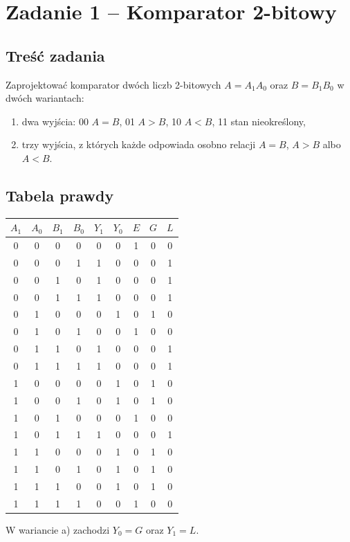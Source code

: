 \documentclass[12pt,a4paper]{article}
\begin{document}
\section{Zadanie 1 -- Komparator 2-bitowy}
\subsection{Treść zadania}
Zaprojektować komparator dwóch liczb 2-bitowych $A=A_1A_0$ oraz $B=B_1B_0$ w dwóch wariantach:
\begin{enumerate}[label=\alph*)]
\item dwa wyjścia: 00  $A=B$, 01  $A>B$, 10  $A<B$, 11 stan nieokreślony,
\item trzy wyjścia, z których każde odpowiada osobno relacji $A=B$, $A>B$ albo $A<B$.
\end{enumerate}
\subsection{Tabela prawdy}
\begin{center}
\small
\begin{tabular}{cccc|cc|ccc}
\toprule
$A_1$&$A_0$&$B_1$&$B_0$&$Y_1$&$Y_0$&$E$&$G$&$L$\\
\midrule
0&0&0&0&0&0&1&0&0\\
0&0&0&1&1&0&0&0&1\\
0&0&1&0&1&0&0&0&1\\
0&0&1&1&1&0&0&0&1\\
0&1&0&0&0&1&0&1&0\\
0&1&0&1&0&0&1&0&0\\
0&1&1&0&1&0&0&0&1\\
0&1&1&1&1&0&0&0&1\\
1&0&0&0&0&1&0&1&0\\
1&0&0&1&0&1&0&1&0\\
1&0&1&0&0&0&1&0&0\\
1&0&1&1&1&0&0&0&1\\
1&1&0&0&0&1&0&1&0\\
1&1&0&1&0&1&0&1&0\\
1&1&1&0&0&1&0&1&0\\
1&1&1&1&0&0&1&0&0\\
\bottomrule
\end{tabular}
\end{center}
W wariancie a) zachodzi $Y_0=G$ oraz $Y_1=L$.
\end{document}
